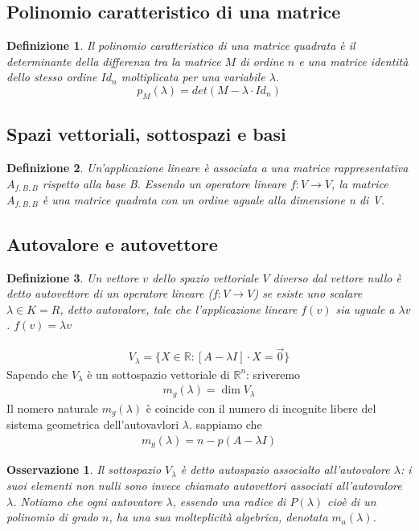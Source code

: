 \documentclass{article}
\newtheorem{defi}{Definizione}[section]
\newtheorem{osservazione}{Osservazione}[section]
\begin{document}
\subsection{Polinomio caratteristico di una matrice}
\label{sec:polinomiocar}

\begin{defi}
  Il polinomio caratteristico di una matrice quadrata è il determinante della
  differenza tra la matrice $M$ di ordine $n$ e una matrice identità dello
  stesso ordine $Id_n$ moltiplicata per una variabile $\lambda$. 
  \begin{equation}
    \label{eq:policar}
     p_M (\lambda) = det(M-\lambda \cdot Id_n)
  \end{equation}
\end{defi}
\subsection{Spazi vettoriali, sottospazi e basi}
\label{sec:spazivettorialisottospazziebasi}
\begin{defi}
  Un'applicazione lineare è associata a una matrice rappresentativa $A_{f,B,B}$
  rispetto alla base B. Essendo un operatore lineare $f:V\to V$, la matrice
  $A_{f,B,B}$ è una matrice quadrata con un ordine uguale alla dimensione n di
  V.
\end{defi}

\subsection{Autovalore e autovettore}
\label{sec:autovaloreeautovettore}
\begin{defi}
  Un vettore $v$ dello spazio vettoriale $V$ diverso dal vettore nullo è detto
  autovettore di un operatore lineare ($f:V\to V$) se esiste uno scalare $\lambda
  \in K=R$, detto autovalore, tale che l'applicazione lineare $f(v)$ sia uguale
  a $\lambda v$. $ f(v) = \lambda v $
\end{defi}
\begin{eqnarray*}
  V_\lambda = \{X\in \mathds{R}:[A-\lambda I]\cdot X =\vec{0}\}
\end{eqnarray*}
Sapendo che $V_\lambda$ è un sottospazio vettoriale di $\mathds{R}^n$: sriveremo
\begin{eqnarray*}
  m_g(\lambda)=\dim V_\lambda
\end{eqnarray*}
Il nomero naturale $m_g(\lambda)$ è coincide con il numero di incognite libere del
sistema geometrica dell'autovavlori $\lambda$. sappiamo che
\begin{eqnarray*}
  m_g(\lambda) = n-p(A-\lambda I)
\end{eqnarray*}
\begin{osservazione}
  Il sottospazio $V_\lambda$ è detto autospazio associalto all'autovalore $\lambda$:
  i suoi elementi non nulli sono invece chiamato autovettori associati all'autovalore
  $\lambda$. Notiamo che ogni autovatore $\lambda$, essendo una radice di $P(\lambda)$
  cioè di un polinomio di grado $n$, ha una sua molteplicità algebrica, denotata
  $m_a(\lambda)$.
\end{osservazione}
\end{document}
